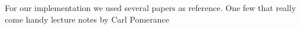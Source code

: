 For our implementation we used several papers as reference. One few that really come handy
lecture notes by Carl Pomerance \cite{Pomerance05smoothnumbers}